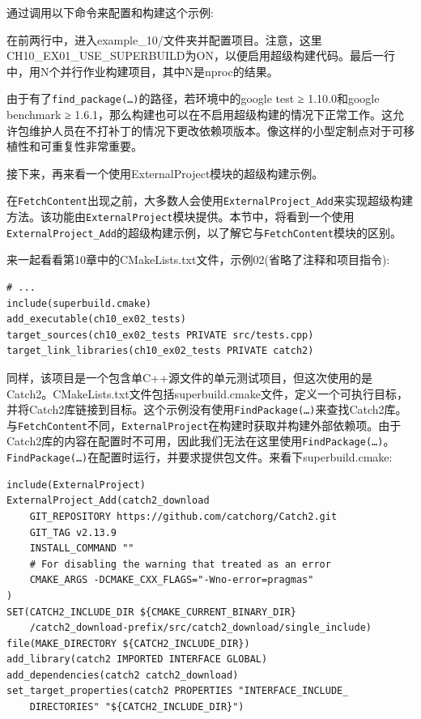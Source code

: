 通过调用以下命令来配置和构建这个示例:


在前两行中，进入example\_10/文件夹并配置项目。注意，这里CH10\_EX01\_USE\_SUPERBUILD为ON，以便启用超级构建代码。最后一行中，用N个并行作业构建项目，其中N是nproc的结果。

由于有了\texttt{find\_package(…)}的路径，若环境中的google test ≥ 1.10.0和google benchmark ≥ 1.6.1，那么构建也可以在不启用超级构建的情况下正常工作。这允许包维护人员在不打补丁的情况下更改依赖项版本。像这样的小型定制点对于可移植性和可重复性非常重要。

接下来，再来看一个使用ExternalProject模块的超级构建示例。


在\texttt{FetchContent}出现之前，大多数人会使用\texttt{ExternalProject\_Add}来实现超级构建方法。该功能由\texttt{ExternalProject}模块提供。本节中，将看到一个使用\texttt{ExternalProject\_Add}的超级构建示例，以了解它与\texttt{FetchContent}模块的区别。

来一起看看第10章中的CMakeLists.txt文件，示例02(省略了注释和项目指令):

\begin{lstlisting}[style=styleCMake]
# ...
include(superbuild.cmake)
add_executable(ch10_ex02_tests)
target_sources(ch10_ex02_tests PRIVATE src/tests.cpp)
target_link_libraries(ch10_ex02_tests PRIVATE catch2)
\end{lstlisting}

同样，该项目是一个包含单C++源文件的单元测试项目，但这次使用的是Catch2。CMakeLists.txt文件包括superbuild.cmake文件，定义一个可执行目标，并将Catch2库链接到目标。这个示例没有使用\texttt{FindPackage(…)}来查找Catch2库。与\texttt{FetchContent}不同，\texttt{ExternalProject}在构建时获取并构建外部依赖项。由于Catch2库的内容在配置时不可用，因此我们无法在这里使用\texttt{FindPackage(…)}。\texttt{FindPackage(…)}在配置时运行，并要求提供包文件。来看下superbuild.cmake:

\begin{lstlisting}[style=styleCMake]
include(ExternalProject)
ExternalProject_Add(catch2_download
	GIT_REPOSITORY https://github.com/catchorg/Catch2.git
	GIT_TAG v2.13.9
	INSTALL_COMMAND ""
	# For disabling the warning that treated as an error
	CMAKE_ARGS -DCMAKE_CXX_FLAGS="-Wno-error=pragmas"
)
SET(CATCH2_INCLUDE_DIR ${CMAKE_CURRENT_BINARY_DIR}
	/catch2_download-prefix/src/catch2_download/single_include)
file(MAKE_DIRECTORY ${CATCH2_INCLUDE_DIR})
add_library(catch2 IMPORTED INTERFACE GLOBAL)
add_dependencies(catch2 catch2_download)
set_target_properties(catch2 PROPERTIES "INTERFACE_INCLUDE_
	DIRECTORIES" "${CATCH2_INCLUDE_DIR}")
\end{lstlisting}

